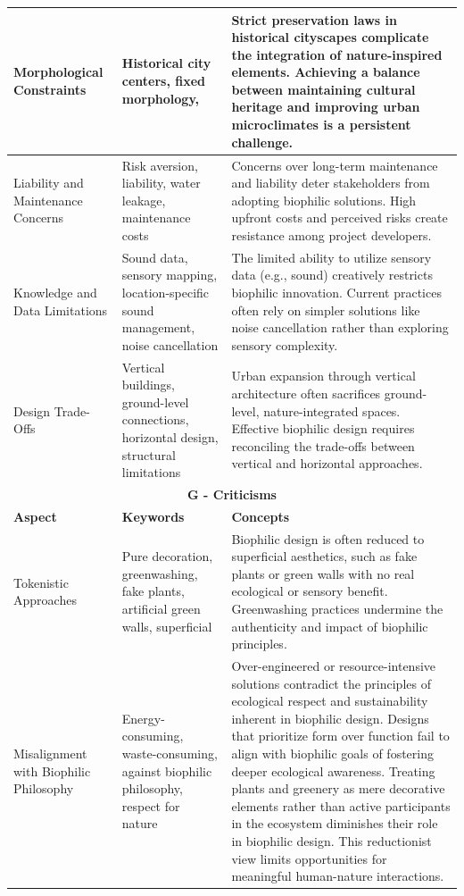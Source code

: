 \begin{longtable}{|p{3cm}|p{3.5cm}|p{7.5cm}|}
Morphological Constraints & Historical city centers, fixed morphology,  & Strict preservation laws in historical cityscapes complicate the integration of nature-inspired elements. Achieving a balance between maintaining cultural heritage and improving urban microclimates is a persistent challenge. \\
\hline

Liability and Maintenance Concerns & Risk aversion, liability, water leakage, maintenance costs & Concerns over long-term maintenance and liability deter stakeholders from adopting biophilic solutions. High upfront costs and perceived risks create resistance among project developers. \\
\hline

Knowledge and Data Limitations & Sound data, sensory mapping, location-specific sound management, noise cancellation & The limited ability to utilize sensory data (e.g., sound) creatively restricts biophilic innovation. Current practices often rely on simpler solutions like noise cancellation rather than exploring sensory complexity. \\
\hline

Design Trade-Offs & Vertical buildings, ground-level connections, horizontal design, structural limitations & Urban expansion through vertical architecture often sacrifices ground-level, nature-integrated spaces. Effective biophilic design requires reconciling the trade-offs between vertical and horizontal approaches. \\
\hline

\multicolumn{3}{|c|}{\cellcolor[HTML]{FFF3E0}\textbf{G - Criticisms}} \\ \hline
\textbf{Aspect} & \textbf{Keywords} & \textbf{Concepts} \\
\hline
Tokenistic Approaches & Pure decoration, greenwashing, fake plants, artificial green walls, superficial & Biophilic design is often reduced to superficial aesthetics, such as fake plants or green walls with no real ecological or sensory benefit. Greenwashing practices undermine the authenticity and impact of biophilic principles. \\
\hline

Misalignment with Biophilic Philosophy & Energy-consuming, waste-consuming, against biophilic philosophy, respect for nature & Over-engineered or resource-intensive solutions contradict the principles of ecological respect and sustainability inherent in biophilic design. Designs that prioritize form over function fail to align with biophilic goals of fostering deeper ecological awareness. Treating plants and greenery as mere decorative elements rather than active participants in the ecosystem diminishes their role in biophilic design. This reductionist view limits opportunities for meaningful human-nature interactions.\\
\hline



\end{longtable}
